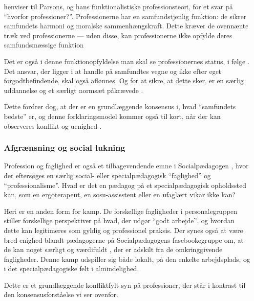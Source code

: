 \citeauthor{frederiksenVelfaerdsprofessionerMellemOmsorg2017} henviser til Parsons, og hans funktionalistiske professionsteori, for et svar på “hvorfor professioner?”.
Professionerne har en samfundstjenlig funktion: de sikrer samfundets harmoni og moralske sammenhængskraft.
Dette kræver de ovennænte træk ved professionerne --- uden disse, kan professionerne ikke opfylde deres samfundsmæssige funktion \autocite[s. 450]{frederiksenVelfaerdsprofessionerMellemOmsorg2017}

Det er også i denne funktionopfyldelse man skal se professionernes status, i følge \citeauthor{frederiksenVelfaerdsprofessionerMellemOmsorg2017}.
Det ansvar, der ligger i at handle på samfundtes vegne og ikke efter eget forgodtbefindende, skal også aflønnes.
Og for at sikre, at dette sker, er en særlig uddannelse og et særligt normsæt påkrævede \autocite[s. 451]{frederiksenVelfaerdsprofessionerMellemOmsorg2017}.

Dette fordrer dog, at der er en grundlæggende konsensus i, hvad “samfundets bedste” er, og denne forklaringsmodel kommer også til kort, når der kan observeres konflikt og uenighed \autocite{frederiksenVelfaerdsprofessionerMellemOmsorg2017}.

\subsubsection{Afgrænsning og social lukning}

Profession og faglighed er også et tilbagevendende emne i Socialpædagogen \autocite[fx]{petersenHvadSigerEksperten2019}, hvor der eftersøges en særlig social- eller specialpædagogisk “faglighed” og “professionalisme”.
Hvad er det en pædagog på et specialpædagogisk opholdssted kan, som en ergoterapeut, en sosu-assisstent eller en ufaglært vikar ikke kan?

Heri er en anden form for kamp.
De forskellige fagligheder i personalegruppen stiller forskellige perspektiver på hvad, der udgør “godt arbejde”, og hvordan dette kan legitimeres som gyldig og professionel praksis.
Der synes også at være bred enighed blandt pædagogerne på Socialpædagogens fasebookegruppe om, at de kan noget særligt og værdifuldt \autocite{petersenSlagsMenneskeligAltmuligmand2019}, der er adskilt fra de omkringgivende fagligheder.
Denne kamp udspiller sig både lokalt, på den enkelte arbejdsplads, og i det specialpædagogiske felt i almindelighed.

Dette er et grundlæggende konfliktfylt syn på professioner, der står i kontrast til den konsensusforståelse vi ser ovenfor.

